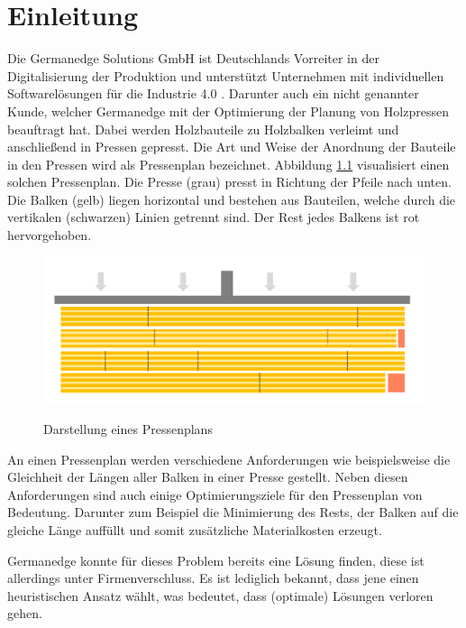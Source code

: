 \chapter{Einleitung}
\label{chapter:Einleitung}

Die Germanedge Solutions GmbH ist Deutschlands Vorreiter in der Digitalisierung der Produktion und
unterstützt Unternehmen mit individuellen Softwarelösungen für die Industrie 4.0 \cite{industry4dot0}.
Darunter auch ein nicht genannter Kunde, welcher Germanedge mit der Optimierung der Planung von Holzpressen beauftragt hat.
Dabei werden Holzbauteile zu Holzbalken verleimt und anschließend in Pressen gepresst.
Die Art und Weise der Anordnung der Bauteile in den Pressen wird als Pressenplan bezeichnet.
Abbildung \ref{figure:pressenplan} visualisiert einen solchen Pressenplan.
Die Presse (grau) presst in Richtung der Pfeile nach unten.
Die Balken (gelb) liegen horizontal und bestehen aus Bauteilen, welche durch die vertikalen (schwarzen) Linien getrennt sind.
Der Rest jedes Balkens ist rot hervorgehoben.

\begin{figure}[h]
    \centering
    \includegraphics[width=1.00\textwidth, center]{Images/Pressenplan}\\
    \caption{Darstellung eines Pressenplans}
    \label{figure:pressenplan}
\end{figure}

An einen Pressenplan werden verschiedene Anforderungen wie beispielsweise die Gleichheit der Längen aller Balken in einer Presse gestellt.
Neben diesen Anforderungen sind auch einige Optimierungsziele für den Pressenplan von Bedeutung.
Darunter zum Beispiel die Minimierung des Rests, der Balken auf die gleiche Länge auffüllt und somit zusätzliche Materialkosten erzeugt.

Germanedge konnte für dieses Problem bereits eine Lösung finden, diese ist allerdings unter Firmenverschluss.
Es ist lediglich bekannt, dass jene einen heuristischen Ansatz wählt, was bedeutet, dass (optimale) Lösungen verloren gehen.

